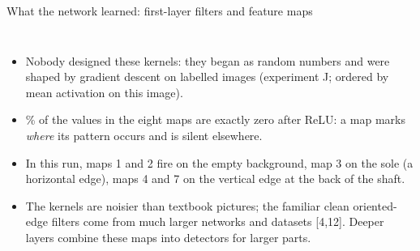 \documentclass[aspectratio=169,10pt]{beamer}
\renewcommand{\cite}[1]{{\scriptsize\color{cTok}[#1]}}
\begin{document}
\begin{frame}{What the network learned: first-layer filters and feature maps}
\begin{columns}[T,onlytextwidth]
\vspace{1mm}
\raggedright\footnotesize
\begin{itemize}
  \item Nobody designed these kernels: they began as random numbers and were shaped by gradient descent
        on \nTrain{} labelled images (experiment J; ordered by mean activation on this image).
  \item \mapSparsity\% of the values in the eight maps are exactly zero after ReLU: a map marks
        \emph{where} its pattern occurs and is silent elsewhere.
  \item In this run, maps 1 and 2 fire on the empty background, map 3 on the sole (a horizontal edge),
        maps 4 and 7 on the vertical edge at the back of the shaft.
  \item The kernels are noisier than textbook pictures; the familiar clean oriented-edge filters come
        from much larger networks and datasets \cite{4,12}. Deeper layers combine these maps into
        detectors for larger parts.
\end{itemize}
\end{columns}
\end{frame}
\end{document}
